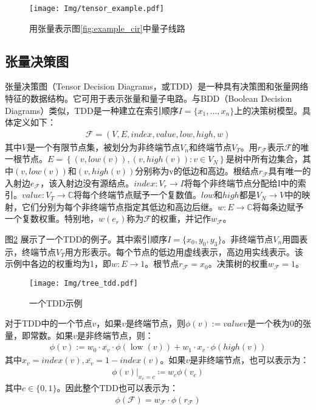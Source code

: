 \begin{figure}[!htbp]
    \centering
    \texttt{[image: Img/tensor\_example.pdf]}
    \caption{用张量表示图\ref{fig:example_cir}中量子线路}   
    \label{fig:example_cir_map}
\end{figure}

\subsection{张量决策图}
张量决策图（Tensor Decision Diagrams，或TDD）是一种具有决策图和张量网络特征的数据结构\citep{Hong_2022}。它可用于表示张量和量子电路。与BDD（Boolean Decision Diagrams）类似，TDD是一种建立在索引顺序$I=\{x_1,\ldots,x_n\}$上的决策树模型。具体定义如下：
\begin{align}
    \mathcal{F}=\left(V,E,index,value,low,high,w\right)
\end{align}
其中$V$是一个有限节点集，被划分为非终端节点$V_n$和终端节点$V_T$。用$r_{\mathcal{F}}$表示$\mathcal{F}$的唯一根节点。$E=\left\{\left(v,low\left(v\right)\right),\left(v,high\left(v\right)\right):v\in V_N\right\}$是树中所有边集合，其中$\left(v,low\left(v\right)\right)$和$\left(v,high\left(v\right)\right)$分别称为v的低边和高边。根结点$r_{\mathcal{F}}$具有唯一的入射边$e_{\mathcal{F}}$，该入射边没有源结点。$index:V_r\rightarrow I$将每个非终端节点分配给I中的索引。$value:V_T\rightarrow\mathbb{C}$将每个终端节点赋予一个复数值。$low$和$high$都是$V_N\rightarrow V$中的映射，它们分别为每个非终端节点指定其低边和高边后继。$w:E\rightarrow\mathbb{C}$将每条边赋予一个复数权重。特别地，$w\left(e_r\right)$称为$\mathcal{F}$的权重，并记作$w_{\mathcal{F}}$。 



图\ref{fig:tdd_ex} 展示了一个TDD的例子。其中索引顺序$I=\{x_0,y_0,y_3\}$。非终端节点$V_n$用圆表示，终端节点$V_T$用方形表示。每个节点的低边用虚线表示，高边用实线表示。该示例中各边的权重均为1，即$w:E\rightarrow 1$。根节点$r_{\mathcal{F}}=x_0$。决策树的权重$w_{\mathcal{F}}=1$。
\begin{figure}[!htbp]
    \centering
    \texttt{[image: Img/tree\_tdd.pdf]}
    \caption{一个TDD示例}   
    \label{fig:tdd_ex}
\end{figure}

对于TDD中的一个节点$v$，如果$v$是终端节点，则$\phi\left(v\right):= valuev$是一个秩为$0$的张量，即常数。如果$v$是非终端节点，则：
\begin{align}
    \phi(v):=w_{0} \cdot \overline{x_{v}} \cdot \phi(\operatorname{low}(v))+w_{1} \cdot x_{v} \cdot \phi(h i g h(v))
\end{align}
其中$x_v=index\left(v\right),\bar{x_v}=1-index\left(v\right)$。如果$v$是非终端节点，也可以表示为：
\begin{align}
    \left.\phi\left(v\right)\right|_{x_v=c}≔w_c \phi (v_c)
\end{align}
其中$c\in\{0,1\}$。因此整个TDD也可以表示为：
\begin{align}
    \phi\left(\mathcal{F}\right)=w_{\mathcal{F}}\cdot\phi\left(r_{\mathcal{F}}\right)
\end{align}
